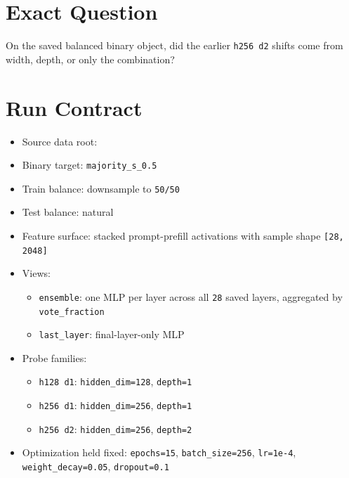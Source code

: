 \documentclass[11pt]{article}
\begin{document}
\section*{Exact Question}
On the saved balanced binary object, did the earlier \texttt{h256 d2} shifts come from width, depth, or only the combination?

\section*{Run Contract}
\begin{itemize}[leftmargin=1.5em]
\item Source data root: 
\item Binary target: \texttt{majority\_s\_0.5}
\item Train balance: downsample to \texttt{50/50}
\item Test balance: natural
\item Feature surface: stacked prompt-prefill activations with sample shape \texttt{[28, 2048]}
\item Views:
  \begin{itemize}[leftmargin=1.5em]
  \item \texttt{ensemble}: one MLP per layer across all \texttt{28} saved layers, aggregated by \texttt{vote\_fraction}
  \item \texttt{last\_layer}: final-layer-only MLP
  \end{itemize}
\item Probe families:
  \begin{itemize}[leftmargin=1.5em]
  \item \texttt{h128 d1}: \texttt{hidden\_dim=128}, \texttt{depth=1}
  \item \texttt{h256 d1}: \texttt{hidden\_dim=256}, \texttt{depth=1}
  \item \texttt{h256 d2}: \texttt{hidden\_dim=256}, \texttt{depth=2}
  \end{itemize}
\item Optimization held fixed: \texttt{epochs=15}, \texttt{batch\_size=256}, \texttt{lr=1e-4}, \texttt{weight\_decay=0.05}, \texttt{dropout=0.1}
\end{itemize}
\end{document}
